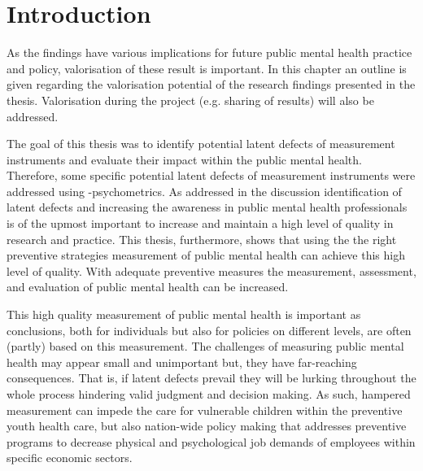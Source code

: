 \section*{Introduction}
As the findings have various implications for future public mental health practice and policy, valorisation of these result is important. 
In this chapter an outline is given regarding the valorisation potential of the research findings presented in the thesis. 
Valorisation during the project (e.g. sharing of results) will also be addressed.

The goal of this thesis was to identify potential latent defects of measurement instruments and evaluate their impact within the public mental health. 
Therefore, some specific potential latent defects of measurement instruments were addressed using \textbeta-psychometrics. 
As addressed in the discussion identification of latent defects and increasing the awareness in public mental health professionals is of the upmost important to increase and maintain a high level of quality in research and practice. 
This thesis, furthermore, shows that using the the right preventive strategies measurement of public mental health can achieve this high level of quality. 
With adequate preventive measures the measurement, assessment, and evaluation of public mental health can be increased.

This high quality measurement of public mental health is important as conclusions, both for individuals but also for policies on different levels, are often (partly) based on this measurement. 
The challenges of measuring public mental health may appear small and unimportant but, they have far-reaching consequences. 
That is, if latent defects prevail they will be lurking throughout the whole process hindering valid judgment and decision making.
As such, hampered measurement can impede the care for vulnerable children within the preventive youth health care, but also nation-wide policy making that addresses preventive programs to decrease physical and psychological job demands of employees within specific economic sectors. 

